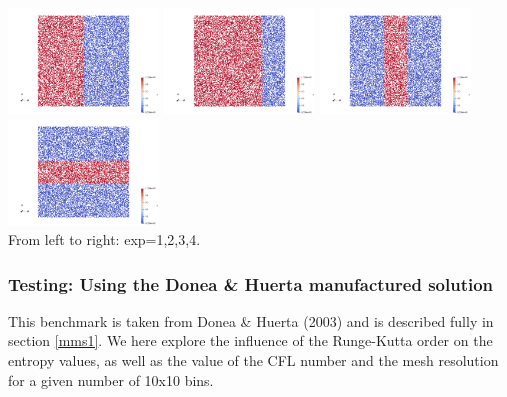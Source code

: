 \begin{center}
\includegraphics[width=4cm]{python_codes/fieldstone_137/images/exp_1}
\includegraphics[width=4cm]{python_codes/fieldstone_137/images/exp_2}
\includegraphics[width=4cm]{python_codes/fieldstone_137/images/exp_3}
\includegraphics[width=4cm]{python_codes/fieldstone_137/images/exp_4}\\
{\captionfont From left to right: exp=1,2,3,4.}
\end{center}

\subsubsection*{Testing: Using the Donea \& Huerta manufactured solution}

This benchmark is taken from Donea \& Huerta (2003) \cite{dohu03} and is described fully 
in section \ref{mms1}. 
We here explore the influence of the Runge-Kutta order on the entropy values, 
as well as the value of the CFL number and 
the mesh resolution for a given number of 10x10 bins. 

